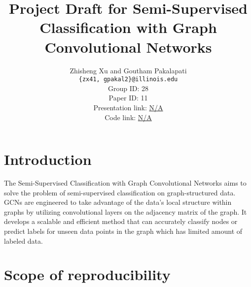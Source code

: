 \documentclass[11pt,a4paper]{article}
\title{Project Draft for Semi-Supervised Classification with Graph Convolutional Networks}
\author{Zhisheng Xu and Goutham Pakalapati\\
  \texttt{\{zx41, gpakal2\}@illinois.edu}
  \\[2em]
  Group ID: 28\\
  Paper ID: 11\\
  Presentation link: \url{N/A} \\
  Code link: \url{N/A}
}
\begin{document}
\maketitle


\section{Introduction}

The Semi-Supervised Classification with Graph Convolutional Networks \cite{kipf2017semi} aims to solve the problem of semi-supervised classification on graph-structured data. GCNs are engineered to take advantage of the data's local structure within graphs by utilizing convolutional layers on the adjacency matrix of the graph. It develops a scalable and efficient method that can accurately classify nodes or predict labels for unseen data points in the graph which has limited amount of labeled data.

\section{Scope of reproducibility}



\end{document}
